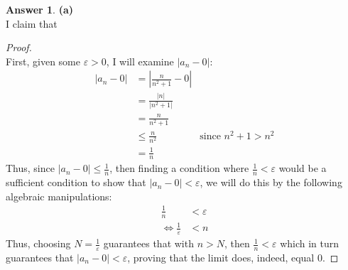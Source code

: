 \documentclass[10pt,a4paper]{article}
\theoremstyle{definition}
\newtheorem*{answer*}{Answer}
\begin{document}
\begin{answer*}{\textbf{(a)}}
\\I claim that 
\begin{proof}{$ $}
\\First, given some $\varepsilon > 0$, I will examine $|a_n - 0|$:
\begin{align*}
|a_n - 0| &= \left|\frac{n}{n^2 + 1} - 0\right|\\
&= \frac{|n|}{|n^2 + 1|}\\
&= \frac{n}{n^2 + 1}\\
&\leq \frac{n}{n^2} &\text{since } n^2 + 1 > n^2\\
&= \frac{1}{n}
\end{align*}
Thus, since $\displaystyle |a_n - 0| \leq \frac{1}{n}$, then finding a condition where $\displaystyle \frac{1}{n} < \varepsilon$ would be a sufficient condition to show that $|a_n - 0| < \varepsilon$, we will do this by the following algebraic manipulations:
\begin{align*}
\frac{1}{n} &< \varepsilon\\
\iff \frac{1}{\varepsilon} &< n
\end{align*}
Thus, choosing $\displaystyle N = \frac{1}{\varepsilon}$ guarantees that with $n > N$, then $\displaystyle \frac{1}{n} < \varepsilon$ which in turn guarantees that $|a_n - 0| < \varepsilon$, proving that the limit does, indeed, equal 0.
\end{proof}
\end{answer*}
\end{document}
